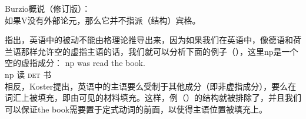 
\ea
Burzio概说（修订版）：\\
如果V没有外部论元，那么它并不指派（结构）宾格。
\z

\noindent
 \citet[]{Koster86a}指出，英语中的被动不能由格理论推导出来，因为如果我们在英语中，像德语和荷兰语那样允许空的虚指主语的话，我们就可以分析下面的例子（），这里np是一个空的虚指成分：
\ea
\gll np was read the book.\\
np \passivepst{} 读 \textsc{det} 书\\
\z
相反，Koster提出，英语中的主语要么受制于其他成分（即非虚指成分），要么在词汇上被填充，即由可见的材料填充。这样，例（）的结构就被排除了，并且我们可以保证the book需要置于定式动词的前面，以使得主语位置被填充上。

